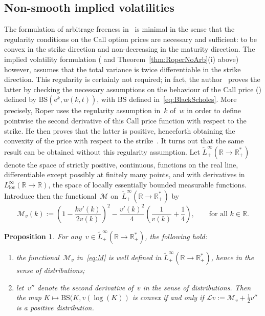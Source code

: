 \documentclass{amsart}[11pt]
\numberwithin{equation}{section}
\newtheorem{proposition}[theorem]{Proposition}
\theoremstyle{definition}
\newcommand{\RR}{\mathbb{R}}
\newcommand{\Ll}{\mathcal{L}}
\newcommand{\Mm}{\mathcal{M}}
\newcommand{\BS}{\mathrm{BS}}
\newcommand{\E}{\mathrm{e}}
\newcommand{\loc}{\mathrm{loc}}
\begin{document}
\subsection{Non-smooth implied volatilities}\label{sec:nonsmooth}
The formulation of arbitrage freeness in~\cite[Theorem 2.1]{roper} 
is minimal in the sense that the regularity conditions on the Call option prices are necessary and sufficient: 
to be convex in the strike direction and non-decreasing in the maturity direction.
The implied volatility formulation (\cite[Theorem 2.9, condition IV.1]{roper} and Theorem~\ref{thm:RoperNoArb}(i) above)
however, assumes that the total variance is twice differentiable in the strike direction. 
This regularity is certainly not required; 
in fact,  the author~\cite[Theorem 2.9]{roper} proves the latter by checking the necessary assumptions 
on the behaviour of the Call price (\cite[Theorem 2.1]{roper}) defined by 
$\BS(\E^k, w(k,t))$,
with $\BS$ defined in~\eqref{eq:BlackScholes}.
More precisely, Roper uses the regularity assumption in~$k$ of~$w$ in order to define pointwise the second derivative of this Call price function with respect to the strike.
He then proves that the latter is positive, henceforth obtaining the convexity of the price with respect to the strike~\cite[Theorem 2.1, Assumption A.1]{roper}.
It turns out that the same result can be obtained without this regularity assumption.
Let $\widetilde{L}^\infty_{+}(\RR\to\RR_+^*)$ denote the 
space of strictly positive, continuous, functions on the real line, 
differentiable except possibly at finitely many points, 
and with derivatives in~$L^\infty_{\loc}(\RR\to\RR)$, 
the space of locally essentially bounded measurable functions.
Introduce then the functional~$\Mm$ on~$\widetilde{L}^\infty_{+}(\RR\to\RR_+^*)$ by
\begin{equation}\label{eq:M}
\Mm_v(k) := \left(1-\frac{kv'(k)}{2v(k)}\right)^2 - \frac{v'(k)^2}{4}\left(\frac{1}{v(k)}+\frac{1}{4}\right),
\qquad\text{for all }k\in\RR.
\end{equation}


\begin{proposition}
For any~$v \in \widetilde{L}^\infty_{+}(\RR\to\RR_+^*)$, the following hold:
\begin{enumerate}
\item the functional~$\Mm_v$ in~\eqref{eq:M}
is well defined in $\widetilde{L}^\infty_{+}(\RR\to\RR_+^*)$, 
hence in the sense of distributions;
\item let~$v''$ denote the second derivative of~$v$ in the sense of distributions. 
Then the map $K \mapsto \BS(K, v(\log(K))$ is convex if and only if 
$\Ll v := \displaystyle \Mm_v + \frac{1}{2}v''$ is a positive distribution.
\end{enumerate}
\end{proposition}
\end{document}
